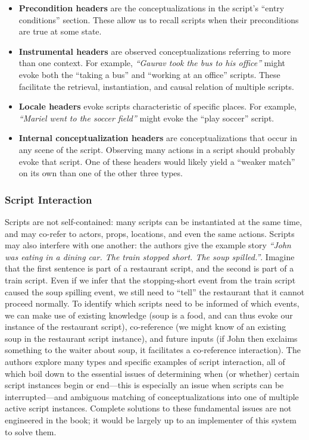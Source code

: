 \begin{itemize}
    \item \textbf{Precondition headers} are the conceptualizations in the script's ``entry conditions'' section. These allow us to recall scripts when their preconditions are true at some state.%
    
    \item \textbf{Instrumental headers} are observed conceptualizations referring to more than one context. For example, \textit{``Gaurav took the bus to his office''} might evoke both the ``taking a bus'' and ``working at an office'' scripts. These facilitate the retrieval, instantiation, and causal relation of multiple scripts.
    
    \item \textbf{Locale headers} evoke scripts characteristic of specific places. For example, \textit{``Mariel went to the soccer field''} might evoke the ``play soccer'' script.
    
    \item \textbf{Internal conceptualization headers} are conceptualizations that occur in any scene of the script. Observing many actions in a script should probably evoke that script. One of these headers would likely yield a ``weaker match'' on its own than one of the other three types.
\end{itemize}
\fi


\subsubsection{Script Interaction}

Scripts are not self-contained: many scripts can be instantiated at the same time, and may co-refer to actors, props, locations, and even the same actions. Scripts may also interfere with one another: the authors give the example story \textit{``John was eating in a dining car. The train stopped short. The soup spilled.''}. Imagine that the first sentence is part of a restaurant script, and the second is part of a train script. Even if we infer that the stopping-short event from the train script caused the soup spilling event, we still need to ``tell'' the restaurant that it cannot proceed normally. To identify which scripts need to be informed of which events, we can make use of existing knowledge (soup is a food, and can thus evoke our instance of the restaurant script), co-reference (we might know of an existing soup in the restaurant script instance), and future inputs (if John then exclaims something to the waiter about soup, it facilitates a co-reference interaction). The authors explore many types and specific examples of script interaction, all of which boil down to the essential issues of determining when (or whether) certain script instances begin or end---this is especially an issue when scripts can be interrupted---and ambiguous matching of conceptualizations into one of multiple active script instances. Complete solutions to these fundamental issues are not engineered in the book; it would be largely up to an implementer of this system to solve them.


